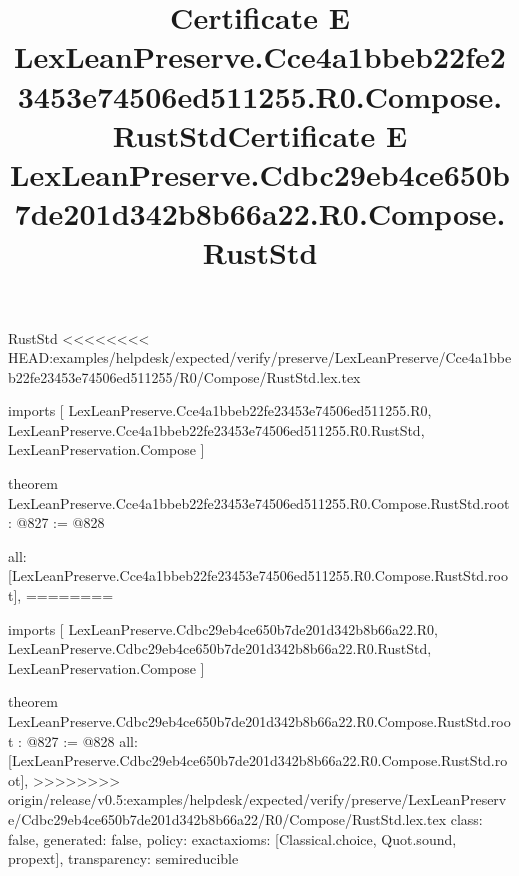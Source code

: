\begin{lexlean}{RustStd}
<<<<<<<< HEAD:examples/helpdesk/expected/verify/preserve/LexLeanPreserve/Cce4a1bbeb22fe23453e74506ed511255/R0/Compose/RustStd.lex.tex
\title{Certificate E LexLeanPreserve.Cce4a1bbeb22fe23453e74506ed511255.R0.Compose.RustStd}
\begin{coremodule}
imports [
  LexLeanPreserve.Cce4a1bbeb22fe23453e74506ed511255.R0,
  LexLeanPreserve.Cce4a1bbeb22fe23453e74506ed511255.R0.RustStd,
  LexLeanPreservation.Compose
]

theorem LexLeanPreserve.Cce4a1bbeb22fe23453e74506ed511255.R0.Compose.RustStd.root : @827 := @828 {
  all: [LexLeanPreserve.Cce4a1bbeb22fe23453e74506ed511255.R0.Compose.RustStd.root],
========
\title{Certificate E LexLeanPreserve.Cdbc29eb4ce650b7de201d342b8b66a22.R0.Compose.RustStd}
\begin{coremodule}
imports [
  LexLeanPreserve.Cdbc29eb4ce650b7de201d342b8b66a22.R0,
  LexLeanPreserve.Cdbc29eb4ce650b7de201d342b8b66a22.R0.RustStd,
  LexLeanPreservation.Compose
]

theorem LexLeanPreserve.Cdbc29eb4ce650b7de201d342b8b66a22.R0.Compose.RustStd.root : @827 := @828 {
  all: [LexLeanPreserve.Cdbc29eb4ce650b7de201d342b8b66a22.R0.Compose.RustStd.root],
>>>>>>>> origin/release/v0.5:examples/helpdesk/expected/verify/preserve/LexLeanPreserve/Cdbc29eb4ce650b7de201d342b8b66a22/R0/Compose/RustStd.lex.tex
  class: false,
  generated: false,
  policy: exact{axioms: [Classical.choice, Quot.sound, propext]},
  transparency: semireducible
}


\end{coremodule}}
\end{coremodule}
\end{lexlean}
